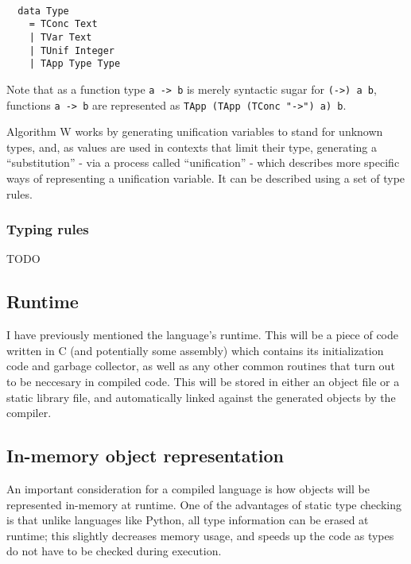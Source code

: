 \documentclass[9pt]{extarticle}
\begin{document}
\begin{verbatim}

  data Type
    = TConc Text
    | TVar Text
    | TUnif Integer
    | TApp Type Type

\end{verbatim}

Note that as a function type \verb'a -> b' is merely syntactic sugar for
\verb'(->) a b', functions \verb'a -> b' are represented as
\verb'TApp (TApp (TConc "->") a) b'.

Algorithm W works by generating unification variables to stand for
unknown types, and, as values are used in contexts that limit their
type, generating a ``substitution'' - via a process called
``unification'' - which describes more specific ways of representing a
unification variable. It can be described using a set of type rules.

\subsubsection{Typing rules}

TODO

\subsection{Runtime}

I have previously mentioned the language's runtime. This will be a piece
of code written in C (and potentially some assembly) which contains its
initialization code and garbage collector, as well as any other common
routines that turn out to be neccesary in compiled code. This will be
stored in either an object file or a static library file, and
automatically linked against the generated objects by the compiler.

\subsection{In-memory object representation}

An important consideration for a compiled language is how objects will
be represented in-memory at runtime. One of the advantages of static
type checking is that unlike languages like Python, all type information
can be erased at runtime; this slightly decreases memory usage, and
speeds up the code as types do not have to be checked during execution.
\end{document}
